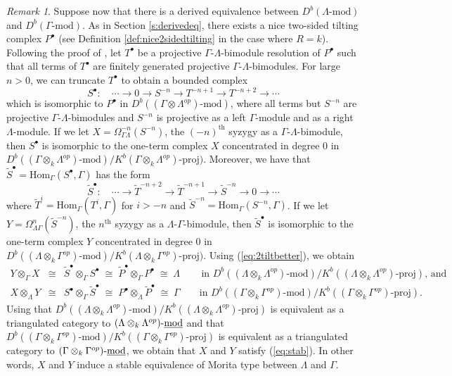 \documentclass{amsart}
\theoremstyle{plain}
\theoremstyle{definition}
\theoremstyle{remark}
\newtheorem{rem}[thm]{Remark}
\begin{document}
\begin{rem}
Suppose now that there is a derived equivalence between $D^b(\Lambda\mbox{-{mod}})$ and 
$D^b(\Gamma\mbox{-{mod}})$. As in Section \ref{s:derivedeq}, there exists 
a nice two-sided tilting complex $P^\bullet$ (see Definition \ref{def:nice2sidedtilting}
in the case where $R=k$). Following the proof of \cite[Cor. 5.5]{rickard1}, let $T^\bullet$ be a projective 
$\Gamma$-$\Lambda$-bimodule resolution of $P^\bullet$ such that all terms of $T^\bullet$ are
finitely generated projective $\Gamma$-$\Lambda$-bimodules. For large $n>0$, we can truncate
$T^\bullet$ to obtain a bounded complex
$$S^\bullet:\quad \cdots \to 0\to S^{-n}\to  T^{-n+1}\to  T^{-n+2}\to \cdots$$
which is isomorphic to $P^\bullet$ in $D^b((\Gamma\otimes\Lambda^{op})\mbox{-{mod}})$, 
where all terms but $S^{-n}$ are projective $\Gamma$-$\Lambda$-bimodules and 
$S^{-n}$ is projective as a left $\Gamma$-module and as a right $\Lambda$-module.
If we let $X=\Omega_{\Gamma\Lambda}^{-n}(S^{-n})$, the
$(-n)^{\mathrm{th}}$ syzygy as a $\Gamma$-$\Lambda$-bimodule, then $S^\bullet$ is isomorphic
to the one-term complex $X$ concentrated in degree 0 in 
$D^b((\Gamma\otimes_k\Lambda^{op})\mbox{-{mod}})/
K^{b}(\Gamma\otimes_k\Lambda^{op})\mbox{-proj})$.
Moreover, we have that $\widetilde{S}^\bullet=\mathrm{Hom}_\Gamma(S^\bullet,\Gamma)$ has the form
$$\widetilde{S}^\bullet:\quad \cdots \to
\widetilde{T}^{-n+2}\to \widetilde{T}^{-n+1}\to \widetilde{S}^{-n}\to 0 \to\cdots$$
where $\widetilde{T}^i=\mathrm{Hom}_\Gamma(T^i,\Gamma)$ for $i>-n$ and 
$\widetilde{S}^{-n}=\mathrm{Hom}_\Gamma(S^{-n},\Gamma)$. 
If we let $Y=\Omega_{\Lambda\Gamma}^{n}(\widetilde{S}^{-n})$, the
$n^{\mathrm{th}}$ syzygy as a $\Lambda$-$\Gamma$-bimodule, then $\widetilde{S}^\bullet$ is isomorphic
to the one-term complex $Y$ concentrated in degree 0 in 
$D^b((\Lambda\otimes_k\Gamma^{op})\mbox{-{mod}})/K^{b}(\Lambda\otimes_k\Gamma^{op})\mbox{-proj})$.
Using (\ref{eq:2tiltbetter}), we obtain
\begin{eqnarray*}
Y\otimes_\Gamma X &\cong& \widetilde{S}^\bullet\otimes_{\Gamma}S^\bullet\;\cong\;
\widetilde{P}^\bullet \otimes_{\Gamma}P^\bullet \;\cong \;
\Lambda \qquad\,
\mbox{in $D^b((\Lambda\otimes_k\Lambda^{op})\mbox{-mod})/K^{b}((\Lambda\otimes_k\Lambda^{op})\mbox{-proj})$, and}\\
X\otimes_\Lambda Y &\cong& S^\bullet\otimes_{\Gamma}\widetilde{S}^\bullet\;\cong\;
P^\bullet \otimes_{\Lambda}\widetilde{P}^\bullet\;\cong\;\Gamma \qquad
\mbox{in $D^b((\Gamma\otimes_k\Gamma^{op})\mbox{-mod})/K^{b}((\Gamma\otimes_k\Gamma^{op})\mbox{-proj})$.}
\end{eqnarray*}
Using that $D^b((\Lambda\otimes_k\Lambda^{op})\mbox{-{mod}})/
K^{b}((\Lambda\otimes_k\Lambda^{op})\mbox{-proj})$ is equivalent as a triangulated
category to $(\Lambda\otimes_k\Lambda^{op})\mbox{-\underline{mod}}$ and that
$D^b((\Gamma\otimes_k\Gamma^{op})\mbox{-{mod}})/
K^{b}((\Gamma\otimes_k\Gamma^{op})\mbox{-proj})$ is equivalent as a triangulated
category to $(\Gamma\otimes_k\Gamma^{op})\mbox{-\underline{mod}}$, we obtain
that $X$ and $Y$ satisfy (\ref{eq:stab}). In other words, $X$ and $Y$ induce  a stable equivalence 
of Morita type between $\Lambda$ and  $\Gamma$.
\end{rem}
\end{document}
